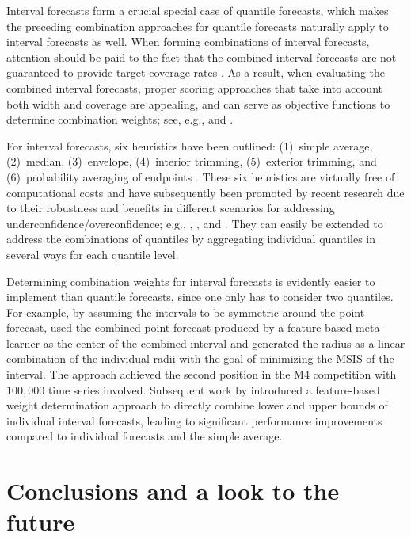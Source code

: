 \documentclass[a4paper,11pt]{article}
\begin{document}
Interval forecasts form a crucial special case of quantile forecasts, which makes the preceding combination approaches for quantile forecasts naturally apply to interval forecasts as well. When forming combinations of interval forecasts, attention should be paid to the fact that the combined interval forecasts are not guaranteed to provide target coverage rates \citep{Wallis2005-yf,Timmermann2006-en,Grushka-Cockayne2020-qv}. As a result, when evaluating the combined interval forecasts, proper scoring approaches that take into account both width and coverage are appealing, and can serve as objective functions to determine combination weights; see, e.g., \citet{Gneiting2007-ij} and \citet{Jose2009-lh}.

For interval forecasts, six heuristics have been outlined: (1)~simple average, (2)~median, (3)~envelope, (4)~interior trimming, (5)~exterior trimming, and (6)~probability averaging of endpoints \citep{Park2015-zn,Gaba2017-om}. These six heuristics are virtually free of computational costs and have subsequently been promoted by recent research due to their robustness and benefits in different scenarios for addressing underconfidence/overconfidence; e.g., \citet{Smyl2019-av}, \citet{Petropoulos2020-fp}, and \citet{Grushka-Cockayne2020-qv}. They can easily be extended to address the combinations of quantiles by aggregating individual quantiles in several ways for each quantile level.

Determining combination weights for interval forecasts is evidently easier to implement than quantile forecasts, since one only has to consider two quantiles. For example, by assuming the intervals to be symmetric around the point forecast, \citet{Montero-Manso2020-tq} used the combined point forecast produced by a feature-based meta-learner as the center of the combined interval and generated the radius as a linear combination of the individual radii with the goal of minimizing the MSIS \citep[mean scaled interval score,][]{Gneiting2007-ij} of the interval. The approach achieved the second position in the M4 competition with $100,000$ time series involved. Subsequent work by \citet{Wang2021-un} introduced a feature-based weight determination approach to directly combine lower and upper bounds of individual interval forecasts, leading to significant performance improvements compared to individual forecasts and the simple average.

\section{Conclusions and a look to the future}
\label{sec:conclusion}
\end{document}
